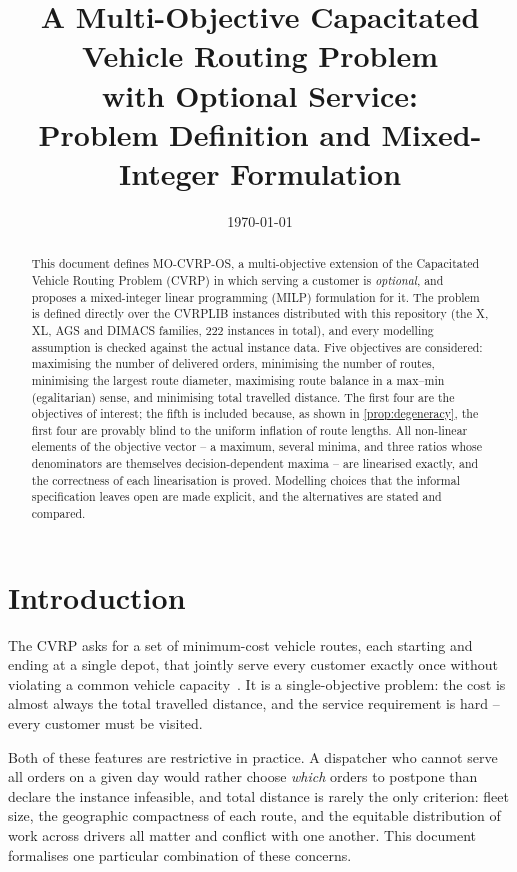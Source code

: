 \documentclass[11pt,a4paper]{article}
\title{\bfseries A Multi-Objective Capacitated Vehicle Routing Problem\\
with Optional Service:\\ Problem Definition and Mixed-Integer Formulation}
\author{}
\date{\today}
\theoremstyle{definition}
\theoremstyle{plain}
\begin{document}
\maketitle

\begin{abstract}
\noindent
This document defines \textup{\textsc{MO-CVRP-OS}}, a multi-objective extension of the
Capacitated Vehicle Routing Problem (CVRP) in which serving a customer is
\emph{optional}, and proposes a mixed-integer linear programming (MILP)
formulation for it.  The problem is defined directly over the CVRPLIB instances
distributed with this repository (the \textsf{X}, \textsf{XL}, \textsf{AGS} and
\textsf{DIMACS} families, \num{222} instances in total), and every modelling
assumption is checked against the actual instance data.  Five objectives are
considered: maximising the number of delivered orders, minimising the number of
routes, minimising the largest route diameter, maximising route balance in a
max--min (egalitarian) sense, and minimising total travelled distance.  The
first four are the objectives of interest; the fifth is included because,
as shown in \cref{prop:degeneracy}, the first four are provably blind to the
uniform inflation of route lengths.  All non-linear elements of the objective
vector -- a maximum, several minima, and three ratios whose denominators are
themselves decision-dependent maxima -- are linearised exactly, and the
correctness of each linearisation is proved.  Modelling choices that the
informal specification leaves open are made explicit, and the alternatives are
stated and compared.
\end{abstract}

\tableofcontents

\section{Introduction}
\label{sec:intro}

The CVRP asks for a set of minimum-cost vehicle routes, each starting and
ending at a single depot, that jointly serve every customer exactly once
without violating a common vehicle capacity~\cite{TothVigo2014}.  It is a
single-objective problem: the cost is almost always the total travelled
distance, and the service requirement is hard -- every customer must be
visited.

Both of these features are restrictive in practice.  A dispatcher who cannot
serve all orders on a given day would rather choose \emph{which} orders to
postpone than declare the instance infeasible, and total distance is rarely the
only criterion: fleet size, the geographic compactness of each route, and the
equitable distribution of work across drivers all matter and conflict with one
another.  This document formalises one particular combination of these
concerns.
\end{document}

